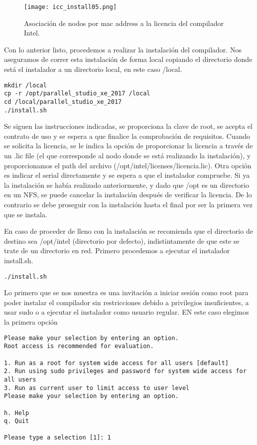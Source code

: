 \begin{figure}[H]
\centering
\texttt{[image: icc\_install05.png]}
\caption{Asociación de nodos por mac address a la licencia del compilador Intel.}
\label{fig:icc:05}
\end{figure}

Con lo anterior listo, procedemos a realizar la instalación del compilador. Nos aseguramos de correr esta instalación de forma local copiando el directorio donde está el instalador a un directorio local, en este caso /local.

\begin{lstlisting} 
mkdir /local
cp -r /opt/parallel_studio_xe_2017 /local
cd /local/parallel_studio_xe_2017
./install.sh
\end{lstlisting}

Se siguen las instrucciones indicadas, se proporciona la clave de root, se acepta el contrato de uso y se espera a que finalice la comprobación de requisitos. Cuando se solicita la licencia, se le indica la opción de proporcionar la licencia a través de un .lic file (el que corresponde al nodo donde se está realizando la instalación), y proporcionamos el path del archivo (/opt/intel/licenses/licencia.lic). Otra opción es indicar el serial directamente y se espera a que el instalador compruebe. Si ya la instalación se había realizado anteriormente, y dado que /opt es un directorio en un NFS, se puede cancelar la instalación después de verificar la licencia. De lo contrario se debe proseguir con la instalación hasta el final por ser la primera vez que se instala.

En caso de proceder de lleno con la instalación se recomienda que el directorio de destino sea /opt/intel (directorio por defecto), indistintamente de que este se trate de un directorio en red. Primero procedemos a ejecutar el instalador install.sh.

\begin{lstlisting}
./install.sh
\end{lstlisting}

Lo primero que se nos muestra es una invitación a iniciar sesión como root para poder instalar el compilador sin restricciones debido a privilegios insuficientes, a usar sudo o a ejecutar el instalador como usuario regular. EN este caso elegimos la primera opción

\begin{lstlisting}
Please make your selection by entering an option.
Root access is recommended for evaluation.

1. Run as a root for system wide access for all users [default]
2. Run using sudo privileges and password for system wide access for all users
3. Run as current user to limit access to user level
Please make your selection by entering an option.

h. Help
q. Quit
 
Please type a selection [1]: 1
\end{lstlisting}

